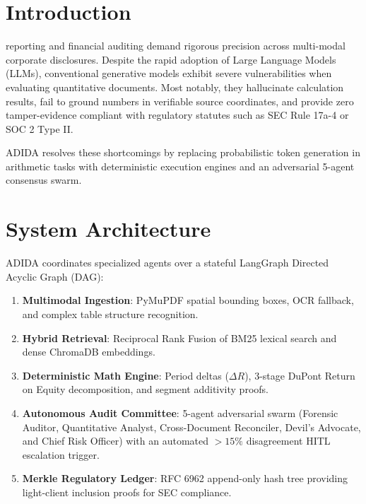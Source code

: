 \documentclass[10pt,journal,compsoc]{IEEEtran}
\begin{document}
\maketitle
\IEEEdisplaynontitleabstractindextext
\IEEEpeerreviewmaketitle

\section{Introduction}
 reporting and financial auditing demand rigorous precision across multi-modal corporate disclosures. Despite the rapid adoption of Large Language Models (LLMs), conventional generative models exhibit severe vulnerabilities when evaluating quantitative documents. Most notably, they hallucinate calculation results, fail to ground numbers in verifiable source coordinates, and provide zero tamper-evidence compliant with regulatory statutes such as SEC Rule 17a-4 or SOC 2 Type II.

ADIDA resolves these shortcomings by replacing probabilistic token generation in arithmetic tasks with deterministic execution engines and an adversarial 5-agent consensus swarm.

\section{System Architecture}
ADIDA coordinates specialized agents over a stateful LangGraph Directed Acyclic Graph (DAG):
\begin{enumerate}
    \item \textbf{Multimodal Ingestion}: PyMuPDF spatial bounding boxes, OCR fallback, and complex table structure recognition.
    \item \textbf{Hybrid Retrieval}: Reciprocal Rank Fusion of BM25 lexical search and dense ChromaDB embeddings.
    \item \textbf{Deterministic Math Engine}: Period deltas ($\Delta R$), 3-stage DuPont Return on Equity decomposition, and segment additivity proofs.
    \item \textbf{Autonomous Audit Committee}: 5-agent adversarial swarm (Forensic Auditor, Quantitative Analyst, Cross-Document Reconciler, Devil's Advocate, and Chief Risk Officer) with an automated $>15\%$ disagreement HITL escalation trigger.
    \item \textbf{Merkle Regulatory Ledger}: RFC 6962 append-only hash tree providing light-client inclusion proofs for SEC compliance.
\end{enumerate}
\end{document}

